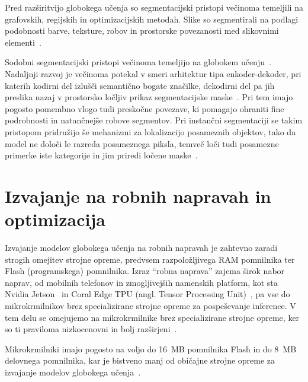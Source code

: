 \documentclass[a4paper,twoside,openright,12pt,slovene]{book}
\begin{document}
            Pred razširitvijo globokega učenja so segmentacijski pristopi večinoma temeljili na grafovskih, regijskih in optimizacijskih metodah. Slike so segmentirali na podlagi podobnosti barve, teksture, robov in prostorske povezanosti med slikovnimi elementi~\cite{src:felzenszwalb2004efficient, src:yu2023techniques}.

            Sodobni segmentacijski pristopi večinoma temeljijo na globokem učenju~\cite{src:minaee2021image, src:yu2023techniques}. Nadaljnji razvoj je večinoma potekal v smeri arhitektur tipa enkoder-dekoder, pri katerih kodirni del izlušči semantično bogate značilke, dekodirni del pa jih preslika nazaj v prostorsko ločljiv prikaz segmentacijske maske~\cite{src:ronneberger2015unet, src:minaee2021image, src:yu2023techniques}. Pri tem imajo pogosto pomembno vlogo tudi preskočne povezave, ki pomagajo ohraniti fine podrobnosti in natančnejše robove segmentov. Pri instančni segmentaciji se takim pristopom pridružijo še mehanizmi za lokalizacijo posameznih objektov, tako da model ne določi le razreda posameznega piksla, temveč loči tudi posamezne primerke iste kategorije in jim priredi ločene maske~\cite{src:he2017mask, src:minaee2021image}.

    \section{Izvajanje na robnih napravah in optimizacija}  \label{sct:teorija-robnenaprave}

        Izvajanje modelov globokega učenja na robnih napravah je zahtevno zaradi strogih omejitev strojne opreme, predvsem razpoložljivega RAM pomnilnika ter Flash (programskega) pomnilnika. Izraz \enquote{robna naprava} zajema širok nabor naprav, od mobilnih telefonov in zmogljivejših namenskih platform, kot sta Nvidia Jetson~\cite{src:nvidiajetson} in Coral Edge TPU (angl. Tensor Processing Unit)~\cite{src:coraledgetpu}, pa vse do mikrokrmilnikov brez specializirane strojne opreme za pospeševanje inference. V tem delu se omejujemo na mikrokrmilnike brez specializirane strojne opreme, ker so ti praviloma nizkocenovni in bolj razširjeni~\cite{src:abadade2023comprehensive}.

        Mikrokrmilniki imajo pogosto na voljo do 16~MB pomnilnika Flash in do 8~MB delovnega pomnilnika, kar je bistveno manj od običajne strojne opreme za izvajanje modelov globokega učenja~\cite{src:abadade2023comprehensive}.
\end{document}
